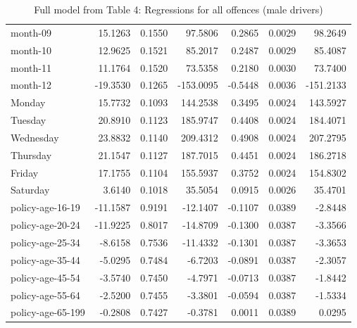 \documentclass[10pt]{article}
\begin{document}
\begin{table}[ht]
\begin{tabular}{lrrrrrr}
  month-09 & 15.1263 & 0.1550 & 97.5806 & 0.2865 & 0.0029 & 98.2649 \\ 
  month-10 & 12.9625 & 0.1521 & 85.2017 & 0.2487 & 0.0029 & 85.4087 \\ 
  month-11 & 11.1764 & 0.1520 & 73.5358 & 0.2180 & 0.0030 & 73.7400 \\ 
  month-12 & -19.3530 & 0.1265 & -153.0095 & -0.5448 & 0.0036 & -151.2133 \\ 
  Monday & 15.7732 & 0.1093 & 144.2538 & 0.3495 & 0.0024 & 143.5927 \\ 
  Tuesday & 20.8910 & 0.1123 & 185.9747 & 0.4408 & 0.0024 & 184.4071 \\ 
  Wednesday & 23.8832 & 0.1140 & 209.4312 & 0.4908 & 0.0024 & 207.2795 \\ 
  Thursday & 21.1547 & 0.1127 & 187.7015 & 0.4451 & 0.0024 & 186.2718 \\ 
  Friday & 17.1755 & 0.1104 & 155.5937 & 0.3752 & 0.0024 & 154.8302 \\ 
  Saturday & 3.6140 & 0.1018 & 35.5054 & 0.0915 & 0.0026 & 35.4701 \\ 
  policy-age-16-19 & -11.1587 & 0.9191 & -12.1407 & -0.1107 & 0.0389 & -2.8448 \\ 
  policy-age-20-24 & -11.9225 & 0.8017 & -14.8709 & -0.1300 & 0.0387 & -3.3566 \\ 
  policy-age-25-34 & -8.6158 & 0.7536 & -11.4332 & -0.1301 & 0.0387 & -3.3653 \\ 
  policy-age-35-44 & -5.0295 & 0.7484 & -6.7203 & -0.0891 & 0.0387 & -2.3057 \\ 
  policy-age-45-54 & -3.5740 & 0.7450 & -4.7971 & -0.0713 & 0.0387 & -1.8442 \\ 
  policy-age-55-64 & -2.5200 & 0.7455 & -3.3801 & -0.0594 & 0.0387 & -1.5334 \\ 
  policy-age-65-199 & -0.2808 & 0.7427 & -0.3781 & 0.0011 & 0.0389 & 0.0295 \\ 
   \hline
\end{tabular}
\caption{Full model from Table 4: Regressions for all offences (male drivers)} 
\label{tab_4_all_pts_with_age_M}
\end{table}


\clearpage
\pagebreak



\end{document}
